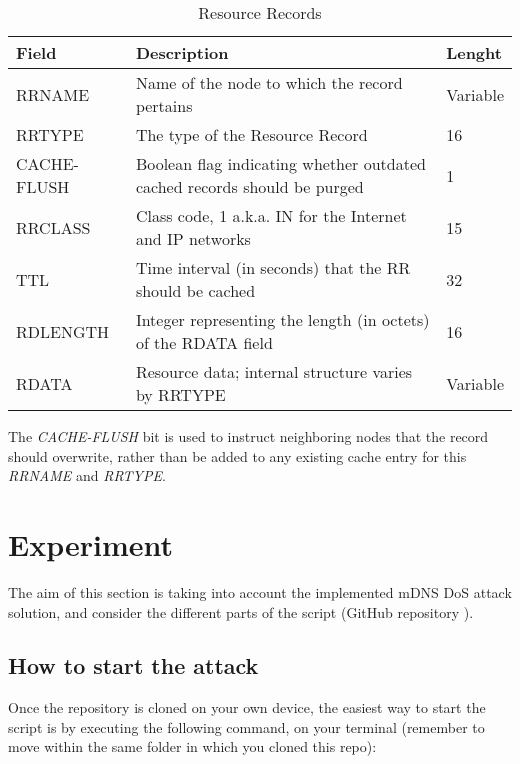 \documentclass[fleqn, 10pt]{SelfArx} %
\begin{document}
\begin{table}[hbt]
	\centering
	\begin{tabular}{|C{1.7cm}|C{4.2cm}|C{1cm}|}
		\hline
		Field & Description & Lenght \\
		\hline
		\hline
		RRNAME & Name of the node to which the record pertains & Variable\\
		\hline
		RRTYPE & The type of the Resource Record & 16\\
		\hline
		CACHE-FLUSH & Boolean flag indicating whether outdated cached records should be purged & 1\\
		\hline
		RRCLASS & Class code, 1 a.k.a. IN for the Internet and IP networks & 15\\
		\hline
		TTL & Time interval (in seconds) that the RR should be cached & 32\\
		\hline
		RDLENGTH & Integer representing the length (in octets) of the RDATA field & 16\\
		\hline
		RDATA & Resource data; internal structure varies by RRTYPE & Variable\\
		\hline
	\end{tabular}
	\caption{Resource Records}
	 \label{table} %
\end{table}

The {\it{CACHE-FLUSH}} bit is used to instruct neighboring nodes that the record should overwrite, rather than be added to any existing cache entry for this {\it{RRNAME}} and {\it{RRTYPE}}.


\section{Experiment}
The aim of this section is taking into account the implemented mDNS DoS attack solution, and consider the different parts of the script
(GitHub repository \cite{repo}).

\subsection{How to start the attack}
Once the repository is cloned on your own device, the easiest way to start the script is by executing the following command, on your terminal (remember to move within the same folder
in which you cloned this repo):
\end{document}
